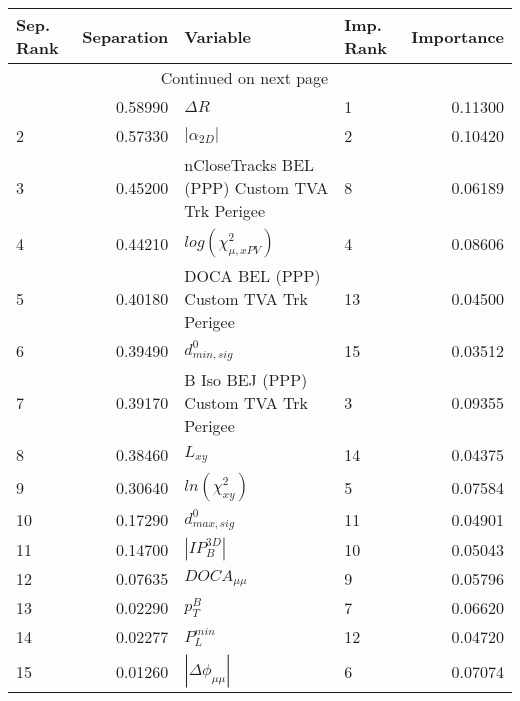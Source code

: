 \usepackage{lscape}

\begin{landscape}
\begin{longtable}{lrllr}
\toprule
Sep. Rank &  Separation &                                       Variable & Imp. Rank &  Importance \\
\midrule
\endhead
\midrule
\multicolumn{3}{r}{{Continued on next page}} \\
\midrule
\endfoot

\bottomrule
\endlastfoot
        1 &     0.58990 &                                     $\Delta R$ &         1 &     0.11300 \\
        2 &     0.57330 &                                $|\alpha_{2D}|$ &         2 &     0.10420 \\
        3 &     0.45200 &  nCloseTracks BEL (PPP) Custom TVA Trk Perigee &         8 &     0.06189 \\
        4 &     0.44210 &                      $log(\chi^{2}_{\mu,xPV})$ &         4 &     0.08606 \\
        5 &     0.40180 &          DOCA BEL (PPP) Custom TVA Trk Perigee &        13 &     0.04500 \\
        6 &     0.39490 &                               $d^0_{min, sig}$ &        15 &     0.03512 \\
        7 &     0.39170 &         B Iso BEJ (PPP) Custom TVA Trk Perigee &         3 &     0.09355 \\
        8 &     0.38460 &                                       $L_{xy}$ &        14 &     0.04375 \\
        9 &     0.30640 &                            $ln(\chi^{2}_{xy})$ &         5 &     0.07584 \\
       10 &     0.17290 &                               $d^0_{max, sig}$ &        11 &     0.04901 \\
       11 &     0.14700 &                                $|IP_{B}^{3D}|$ &        10 &     0.05043 \\
       12 &     0.07635 &                                $DOCA_{\mu\mu}$ &         9 &     0.05796 \\
       13 &     0.02290 &                                      $p^B_{T}$ &         7 &     0.06620 \\
       14 &     0.02277 &                                  $P^{min}_{L}$ &        12 &     0.04720 \\
       15 &     0.01260 &                       $|\Delta \phi_{\mu\mu}|$ &         6 &     0.07074 \\
\end{longtable}

\end{landscape}
